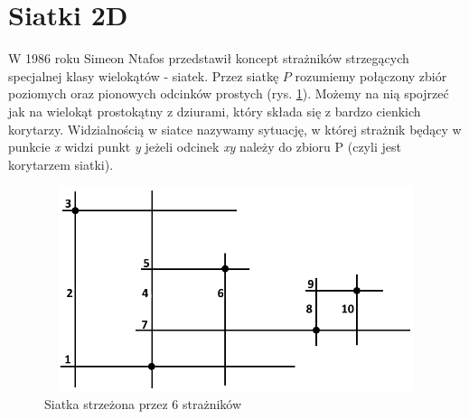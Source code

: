 \documentclass[brudnopis]{xmgr}
\begin{document}
\section{Siatki 2D}
W 1986 roku Simeon Ntafos przedstawił koncept strażników strzegących specjalnej klasy wielokątów - siatek.
Przez siatkę $P$ rozumiemy połączony zbiór poziomych oraz pionowych odcinków prostych (rys. \ref{fig:siatka 2d}). Możemy na nią spojrzeć jak na wielokąt prostokątny z dziurami, który składa się z bardzo cienkich korytarzy.
Widzialnością w siatce nazywamy sytuację, w której strażnik będący w punkcie \textit{x} widzi punkt \textit{y} jeżeli odcinek \textit{xy} należy do zbioru P (czyli jest korytarzem siatki).
 \begin{figure}[ht!]
   \centering
   \includegraphics[width=14cm,height=6cm]{rysunki/przykladowa_siatka.png}
   \caption{Siatka strzeżona przez 6 strażników}
   \label{fig:siatka 2d}
 \end{figure} 
\end{document}
